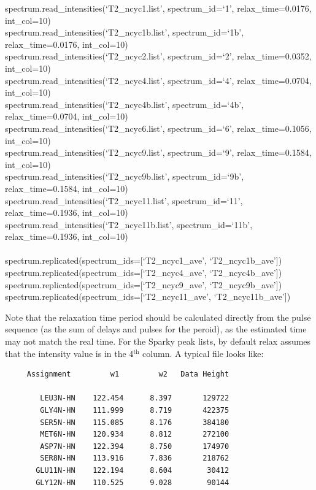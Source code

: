 \begin{exampleenv}
spectrum.read\_intensities(`T2\_ncyc1.list',   spectrum\_id=`1',   relax\_time=0.0176, int\_col=10) \\
spectrum.read\_intensities(`T2\_ncyc1b.list',  spectrum\_id=`1b',  relax\_time=0.0176, int\_col=10) \\
spectrum.read\_intensities(`T2\_ncyc2.list',   spectrum\_id=`2',   relax\_time=0.0352, int\_col=10) \\
spectrum.read\_intensities(`T2\_ncyc4.list',   spectrum\_id=`4',   relax\_time=0.0704, int\_col=10) \\
spectrum.read\_intensities(`T2\_ncyc4b.list',  spectrum\_id=`4b',  relax\_time=0.0704, int\_col=10) \\
spectrum.read\_intensities(`T2\_ncyc6.list',   spectrum\_id=`6',   relax\_time=0.1056, int\_col=10) \\
spectrum.read\_intensities(`T2\_ncyc9.list',   spectrum\_id=`9',   relax\_time=0.1584, int\_col=10) \\
spectrum.read\_intensities(`T2\_ncyc9b.list',  spectrum\_id=`9b',  relax\_time=0.1584, int\_col=10) \\
spectrum.read\_intensities(`T2\_ncyc11.list',  spectrum\_id=`11',  relax\_time=0.1936, int\_col=10) \\
spectrum.read\_intensities(`T2\_ncyc11b.list', spectrum\_id=`11b', relax\_time=0.1936, int\_col=10) \\
 \\
spectrum.replicated(spectrum\_ids=[`T2\_ncyc1\_ave', `T2\_ncyc1b\_ave']) \\
spectrum.replicated(spectrum\_ids=[`T2\_ncyc4\_ave', `T2\_ncyc4b\_ave']) \\
spectrum.replicated(spectrum\_ids=[`T2\_ncyc9\_ave', `T2\_ncyc9b\_ave']) \\
spectrum.replicated(spectrum\_ids=[`T2\_ncyc11\_ave', `T2\_ncyc11b\_ave'])
\end{exampleenv}

Note that the relaxation time period should be calculated directly from the pulse sequence (as the sum of delays and pulses for the peroid), as the estimated time may not match the real time.   For the Sparky peak lists, by default relax assumes that the intensity value is in the 4$^\textrm{th}$ column.  A typical file looks like:

{\scriptsize \begin{verbatim}
     Assignment         w1         w2   Data Height

        LEU3N-HN    122.454      8.397       129722
        GLY4N-HN    111.999      8.719       422375
        SER5N-HN    115.085      8.176       384180
        MET6N-HN    120.934      8.812       272100
        ASP7N-HN    122.394      8.750       174970
        SER8N-HN    113.916      7.836       218762
       GLU11N-HN    122.194      8.604        30412
       GLY12N-HN    110.525      9.028        90144
\end{verbatim}}

